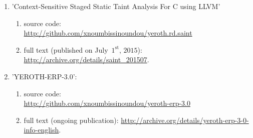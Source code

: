 \begin{enumerate}
	\item 'Context-Sensitive Staged Static Taint Analysis
			For C using LLVM'
		\begin{enumerate}[1.]
			\itemsep -0.7em
			\item source code: \\
			\url{http://github.com/xnoumbissinoundou/yeroth.rd.saint}
			\item full text (published on July~$1^\text{st}$, $2015$): \url{http://archive.org/details/saint_201507}.
		\end{enumerate}		 

	\item 'YEROTH-ERP-3.0':
			\begin{enumerate}[1.]
			\itemsep -0.7em
			\item source code: \\
			\url{http://github.com/xnoumbissinoundou/yeroth-erp-3.0}
			\item full text (ongoing publication): \url{http://archive.org/details/yeroth-erp-3-0-info-english}.
		\end{enumerate}	
\end{enumerate}
